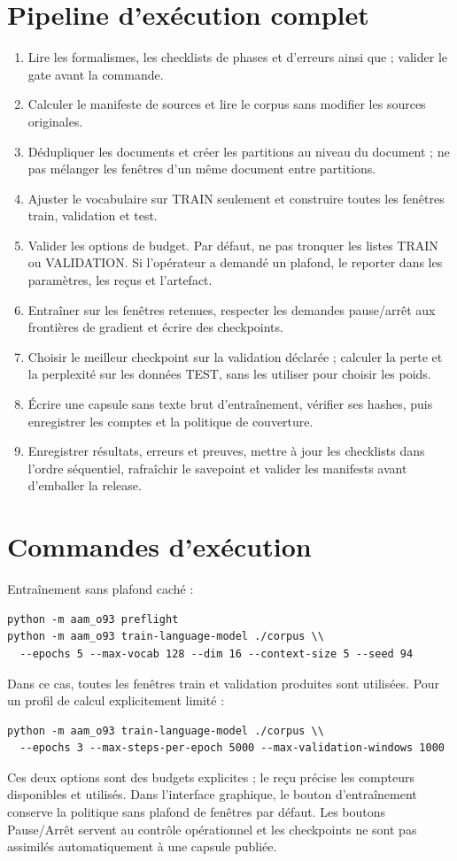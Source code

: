 \documentclass[11pt,a4paper]{article}
\begin{document}
\section{Pipeline d'exécution complet}
\begin{enumerate}
\item Lire les formalismes, les checklists de phases et d'erreurs ainsi que \texttt{}; valider le gate avant la commande.
\item Calculer le manifeste de sources et lire le corpus sans modifier les sources originales.
\item Dédupliquer les documents et créer les partitions au niveau du document ; ne pas mélanger les fenêtres d'un même document entre partitions.
\item Ajuster le vocabulaire sur TRAIN seulement et construire toutes les fenêtres train, validation et test.
\item Valider les options de budget. Par défaut, ne pas tronquer les listes TRAIN ou VALIDATION. Si l'opérateur a demandé un plafond, le reporter dans les paramètres, les reçus et l'artefact.
\item Entraîner sur les fenêtres retenues, respecter les demandes pause/arrêt aux frontières de gradient et écrire des checkpoints.
\item Choisir le meilleur checkpoint sur la validation déclarée ; calculer la perte et la perplexité sur les données TEST, sans les utiliser pour choisir les poids.
\item Écrire une capsule sans texte brut d'entraînement, vérifier ses hashes, puis enregistrer les comptes et la politique de couverture.
\item Enregistrer résultats, erreurs et preuves, mettre à jour les checklists dans l'ordre séquentiel, rafraîchir le savepoint et valider les manifests avant d'emballer la release.
\end{enumerate}

\section{Commandes d'exécution}
Entraînement sans plafond caché :
\begin{verbatim}
python -m aam_o93 preflight
python -m aam_o93 train-language-model ./corpus \\
  --epochs 5 --max-vocab 128 --dim 16 --context-size 5 --seed 94
\end{verbatim}
Dans ce cas, toutes les fenêtres train et validation produites sont utilisées. Pour un profil de calcul explicitement limité :
\begin{verbatim}
python -m aam_o93 train-language-model ./corpus \\
  --epochs 3 --max-steps-per-epoch 5000 --max-validation-windows 1000
\end{verbatim}
Ces deux options sont des budgets explicites ; le reçu précise les compteurs disponibles et utilisés. Dans l'interface graphique, le bouton d'entraînement conserve la politique sans plafond de fenêtres par défaut. Les boutons Pause/Arrêt servent au contrôle opérationnel et les checkpoints ne sont pas assimilés automatiquement à une capsule publiée.
\end{document}
